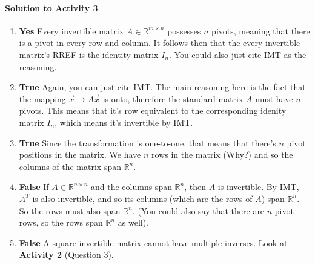 \paragraph{Solution to Activity 3}
\begin{enumerate}
	\item \textbf{Yes} Every invertible matrix \(A \in \mathbb{R}^{m \times n}\) possesses \(n\) pivots, meaning that there is a pivot in every row and column. It follows
		then that the every invertible matrix's RREF is the identity matrix \(I_n\). You could also just cite IMT as the reasoning.
	\item \textbf{True} Again, you can just cite IMT. The main reasoning here is the fact that the mapping \(\vec{x} \mapsto A\vec{x}\) is onto, therefore the standard
		matrix \(A\) must have \(n\) pivots. This means that it's row equivalent to the corresponding idenity matrix \(I_n\), which means it's invertible by IMT.
	\item \textbf{True} Since the transformation is one-to-one, that means that there's \(n\) pivot positions in the matrix. We have \(n\) rows in the matrix (Why?) and
		so the columns of the matrix span \(\mathbb{R}^n\).
	\item \textbf{False} If \(A \in \mathbb{R}^{n \times n}\) and the columns span \(\mathbb{R}^n\), then \(A\) is invertible. By IMT, \(A^T\) is also invertible, and so
		its columns (which are the rows of \(A\)) span \(\mathbb{R}^n\). So the rows must also span \(\mathbb{R}^n\). (You could also say that there are \(n\) pivot
		rows, so the rows span \(\mathbb{R}^n\) as well).
	\item \textbf{False} A square invertible matrix cannot have multiple inverses. Look at \textbf{Activity 2} (Question 3).
\end{enumerate}

